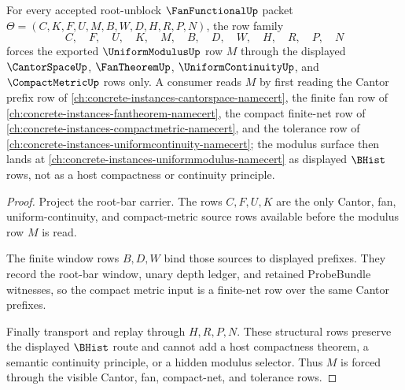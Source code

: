 \begin{theorem}
\label{thm:fanfunctional-root-cantor-compact-modulus}
For every accepted root-unblock $\FanFunctionalUp$ packet $\Theta=(C,K,F,U,M,B,W,D,H,R,P,N)$, the row family
$$
C,\quad F,\quad U,\quad K,\quad M,\quad B,\quad D,\quad W,\quad H,\quad R,\quad P,\quad N
$$
forces the exported $\UniformModulusUp$ row $M$ through the displayed $\CantorSpaceUp$, $\FanTheoremUp$, $\UniformContinuityUp$, and $\CompactMetricUp$ rows only. A consumer reads $M$ by first reading the Cantor prefix row of \autoref{ch:concrete-instances-cantorspace-namecert}, the finite fan row of \autoref{ch:concrete-instances-fantheorem-namecert}, the compact finite-net row of \autoref{ch:concrete-instances-compactmetric-namecert}, and the tolerance row of \autoref{ch:concrete-instances-uniformcontinuity-namecert}; the modulus surface then lands at \autoref{ch:concrete-instances-uniformmodulus-namecert} as displayed $\BHist$ rows, not as a host compactness or continuity principle.
\end{theorem}
\begin{proof}
Project the root-bar carrier. The rows $C,F,U,K$ are the only Cantor, fan, uniform-continuity, and compact-metric source rows available before the modulus row $M$ is read.

The finite window rows $B,D,W$ bind those sources to displayed prefixes. They record the root-bar window, unary depth ledger, and retained ProbeBundle witnesses, so the compact metric input is a finite-net row over the same Cantor prefixes.

Finally transport and replay through $H,R,P,N$. These structural rows preserve the displayed $\BHist$ route and cannot add a host compactness theorem, a semantic continuity principle, or a hidden modulus selector. Thus $M$ is forced through the visible Cantor, fan, compact-net, and tolerance rows.
\end{proof}

